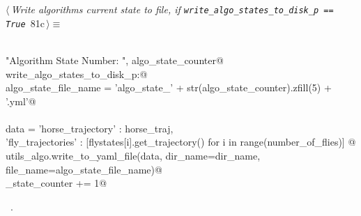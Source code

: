 \documentclass[11.5pt]{report}
\begin{document}
\vspace{-0.8cm} \newchunk 
\begin{flushleft} \small\label{scrap129}\raggedright\small
{} $\langle\,${\itshape Write algorithms current state to file, if \verb|write_algo_states_to_disk_p == True|}\nobreak\ {\footnotesize {81c}}$\,\rangle\equiv$
\vspace{-1ex}
\begin{list}{}{} \item
\mbox{}\verb@@\\
\mbox{}\verb@print "Algorithm State Number: ", algo_state_counter@\\
\mbox{}\verb@if write_algo_states_to_disk_p:@\\
\mbox{}\verb@     algo_state_file_name = 'algo_state_' + str(algo_state_counter).zfill(5) + '.yml'@\\
\mbox{}\verb@@\\
\mbox{}\verb@     data = {'horse_trajectory' : horse_traj, \@\\
\mbox{}\verb@             'fly_trajectories' : [flystates[i].get_trajectory() for i in range(number_of_flies)] }@\\
\mbox{}\verb@     utils_algo.write_to_yaml_file(data, dir_name=dir_name, file_name=algo_state_file_name)@\\
\mbox{}\verb@algo_state_counter += 1@\\
\mbox{}\verb@@{\NWsep}
\end{list}
\vspace{-1.5ex}
\footnotesize
\begin{list}{}{\setlength{\itemsep}{-\parsep}\setlength{\itemindent}{-\leftmargin}}
\item \NWtxtMacroRefIn\ .

\item{}
\end{list}
\vspace{4ex}
\end{flushleft}
\end{document}
